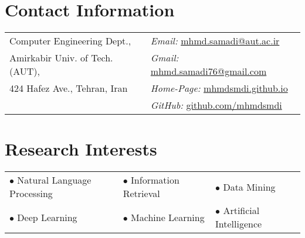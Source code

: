 \documentclass[margin,line]{res}
\begin{document}

\begin{resume}
	\section{\sc Contact Information}
	\begin{tabular}{@{}p{3.5in}p{4in}}
		Computer Engineering Dept.,& {\it Email:} \href{mailto:mhmd.samadi@aut.ac.ir}{mhmd.samadi@aut.ac.ir} \\            
		Amirkabir Univ. of Tech. (AUT), & {\it Gmail:} \href{mailto:mhmd.samadi76@gmail.com}{mhmd.samadi76@gmail.com} \\         
		424 Hafez Ave., Tehran, Iran & {\it Home-Page:}  \href{http://mhmdsmdi.github.io}{mhmdsmdi.github.io} \\       
		& {\it GitHub:} \href{http://github.com/mhmdsmdi}{github.com/mhmdsmdi}     \\ 
	\end{tabular}
	
	\section{\sc Research Interests}
	\hspace{0.03in}
	\begin{tabular}{@{}p{2in}p{2in}p{2in}}
		$\bullet$ Natural Language Processing & $\bullet$ Information Retrieval & $\bullet$ Data Mining \\            
		$\bullet$ Deep Learning &  $\bullet$ Machine Learning & $\bullet$ Artificial Intelligence \\         
	\end{tabular}
	
	

\end{resume}
\end{document}
